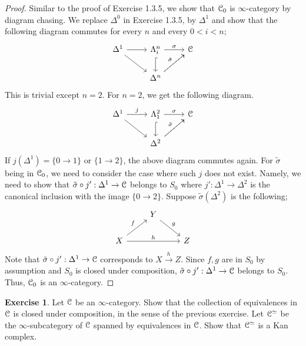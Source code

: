 \documentclass[10pt,a4paper,reqno,oneside]{book} %
\theoremstyle{plain}
\theoremstyle{definition}
\newtheorem{exercise}[thm]{Exercise}
\theoremstyle{remark}
\numberwithin{equation}{section}
\begin{document}
\begin{proof}
    Similar to the proof of Exercise 1.3.5, we show that $\mathcal C_0$ is $\infty$-category by diagram chasing. We replace $\Delta^0$ in Exercise 1.3.5, by $\Delta^1$ and show that the following diagram commutes for every $n$ and every $0<i<n$;
    \[ \begin{tikzcd}
		\Delta^1 \arrow{r} \arrow{dr} & \Lambda^n_i \arrow{r}{\sigma} \arrow[hook]{d} & \cC \\
		{} & \Delta^n \arrow[dashed]{ur}{\tilde{\sigma}} \arrow{ur} & {} 
	\end{tikzcd} \]
	This is trivial except $n=2$. For $n=2$, we get the following diagram.
	\[ \begin{tikzcd}
		\Delta^1 \arrow{r}{j} \arrow{dr} & \Lambda^2_1 \arrow{r}{\sigma} \arrow[hook]{d} & \cC \\
		{} & \Delta^2 \arrow[dashed]{ur}{\tilde{\sigma}} \arrow{ur} & {} 
	\end{tikzcd} \]
	If $j(\Delta^1)=\{0 \to 1\}$ or $\{1 \to 2\}$, the above diagram commutes again. For $\tilde{\sigma}$ being in $\mathcal C_0$, we need to consider the case where such $j$ does not exist. Namely, we need to show that $\tilde{\sigma} \circ j':\Delta^1 \to \mathcal C$ belongs to $S_0$ where $j':\Delta^1 \to \Delta^2$ is the canonical inclusion with the image $\{0 \to 2\}$. Suppose $\tilde{\sigma}(\Delta^2)$ is the following;
	\[ \begin{tikzcd}
	{} & Y \arrow{dr}{g} \\
	X \arrow{ur}{f} \arrow{rr}{h} & & Z
	\end{tikzcd} \]
	Note that $\tilde{\sigma} \circ j':\Delta^1 \to \mathcal C$ corresponds to $X \xrightarrow{h} Z$. Since $f, g$ are in $S_0$ by assumption and $S_0$ is closed under composition, $\tilde{\sigma} \circ j':\Delta^1 \to \mathcal C$ belongs to $S_0$. Thus, $\mathcal C_0$ is an $\infty$-category. 
\end{proof}

\begin{exercise}
	Let $\mathcal C$ be an $\infty$-category. Show that the collection of equivalences in $\mathcal C$ is closed under composition, in the sense of the previous exercise.
	Let $\mathcal C^{\simeq}$ be the $\infty$-subcategory of $\mathcal C$ spanned by equivalences in $\mathcal C$.
	Show that $\mathcal C^{\simeq}$ is a Kan complex.
\end{exercise}
\end{document}
